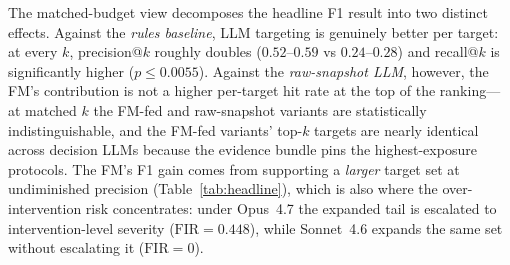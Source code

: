 The matched-budget view decomposes the headline F1 result into two
distinct effects. Against the \emph{rules baseline}, LLM targeting
is genuinely better per target: at every $k$, precision@$k$ roughly
doubles ($0.52$--$0.59$ vs $0.24$--$0.28$) and recall@$k$ is
significantly higher ($p\!\leq\!0.0055$). Against the
\emph{raw-snapshot LLM}, however, the FM's contribution is not a
higher per-target hit rate at the top of the ranking---at matched
$k$ the FM-fed and raw-snapshot variants are statistically
indistinguishable, and the FM-fed variants' top-$k$ targets are
nearly identical across decision LLMs because the evidence bundle
pins the highest-exposure protocols. The FM's F1 gain comes from
supporting a \emph{larger} target set at undiminished precision
(Table~\ref{tab:headline}), which is also where the
over-intervention risk concentrates: under Opus~4.7 the expanded
tail is escalated to intervention-level severity
($\mathrm{FIR}\!=\!0.448$), while Sonnet~4.6 expands the same set
without escalating it ($\mathrm{FIR}\!=\!0$).
